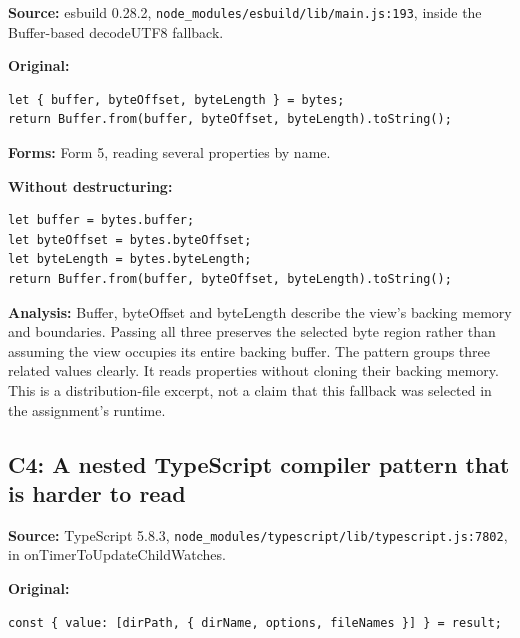 \documentclass[10pt,a4paper]{article}
\begin{document}
\textbf{Source:} esbuild 0.28.2, \texttt{node\_\allowbreak{}modules/\allowbreak{}esbuild/\allowbreak{}lib/\allowbreak{}main.\allowbreak{}js:\allowbreak{}193}, inside the Buffer-based decodeUTF8 fallback.


\textbf{Original:}

\begin{lstlisting}[language=GuideJS]
let { buffer, byteOffset, byteLength } = bytes;
return Buffer.from(buffer, byteOffset, byteLength).toString();
\end{lstlisting}

\textbf{Forms:} Form 5, reading several properties by name.


\textbf{Without destructuring:}

\begin{lstlisting}[language=GuideJS]
let buffer = bytes.buffer;
let byteOffset = bytes.byteOffset;
let byteLength = bytes.byteLength;
return Buffer.from(buffer, byteOffset, byteLength).toString();
\end{lstlisting}

\textbf{Analysis:} Buffer, byteOffset and byteLength describe the view's backing memory and boundaries. Passing all three preserves the selected byte region rather than assuming the view occupies its entire backing buffer. The pattern groups three related values clearly. It reads properties without cloning their backing memory. This is a distribution-file excerpt, not a claim that this fallback was selected in the assignment's runtime.

\subsection{C4: A nested TypeScript compiler pattern that is harder to read}

\textbf{Source:} TypeScript 5.8.3, \texttt{node\_\allowbreak{}modules/\allowbreak{}typescript/\allowbreak{}lib/\allowbreak{}typescript.\allowbreak{}js:\allowbreak{}7802}, in onTimerToUpdateChildWatches.


\textbf{Original:}

\begin{lstlisting}[language=GuideJS]
const { value: [dirPath, { dirName, options, fileNames }] } = result;
\end{lstlisting}
\end{document}

